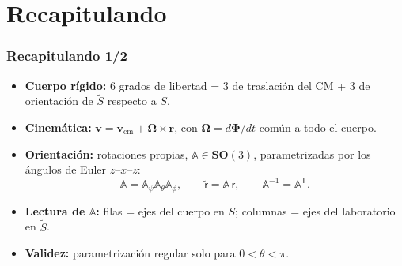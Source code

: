 \documentclass[spanish]{beamer}
\newcommand{\vect}[1]{\mathbf{#1}}              %
\newcommand{\bOmega}{\bm{\Omega}}               %
\newcommand{\dPhi}{d\bm{\Phi}}                  %
\newcommand{\Rot}{\mathbb{A}}                   %
\newcommand{\Slab}{S}                           %
\newcommand{\Scue}{\tilde{S}}                   %
\newcommand{\colLab}[1]{\mathsf{#1}}            %
\newcommand{\colCue}[1]{\tilde{\mathsf{#1}}}    %
\newcommand{\tr}{\mathsf{T}}                    %
\begin{document}
\section{Recapitulando}

\begin{frame}
  \frametitle{Recapitulando 1/2}
  \begin{itemize}
    \item<1-> \textbf{Cuerpo rígido:} 6 grados de libertad = 3 de traslación del CM +
          3 de orientación de $\Scue$ respecto a $\Slab$.
    \item<2-> \textbf{Cinemática:} $\vect{v}=\vect{v}_{\mathrm{cm}}+\bOmega\times\vect{r}$,
          con $\bOmega=\dPhi/dt$ común a todo el cuerpo.
    \item<3-> \textbf{Orientación:} rotaciones propias, $\Rot\in\mathbf{SO}(3)$,
          parametrizadas por los ángulos de Euler $z$–$x$–$z$:
          \[
            \Rot=\Rot_\psi\Rot_\theta\Rot_\phi,\qquad
            \colCue{r}=\Rot\,\colLab{r},\qquad
            \Rot^{-1}=\Rot^{\tr}.
          \]
    \item<4-> \textbf{Lectura de $\Rot$:} filas = ejes del cuerpo en $\Slab$;
          columnas = ejes del laboratorio en $\Scue$.
    \item<5-> \textbf{Validez:} parametrización regular solo para $0<\theta<\pi$.
  \end{itemize}
\end{frame}
\end{document}
